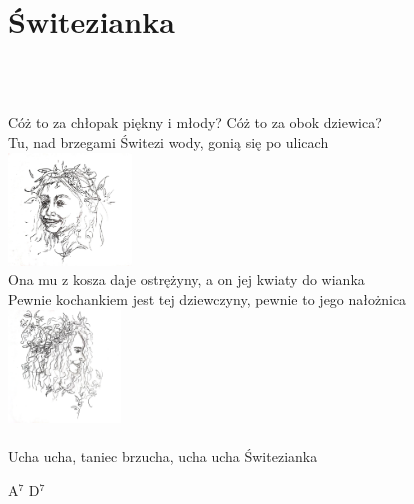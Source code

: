 \documentclass[a5paper, 10pt]{book}
\begin{document}
\section{Świtezianka}\textcolor{lightgray}{\textit{}}\\~\\
\begin{minipage}[t]{0.8\textwidth}
Cóż to za chłopak piękny i młody? Cóż to za obok dziewica?\\
Tu, nad brzegami Świtezi wody, gonią się po ulicach\\
\hspace*{10.5cm}\includegraphics[height=3cm]{switezianka.png}\vspace*{-3.1cm}\\
Ona mu z kosza daje ostrężyny, a on jej kwiaty do wianka\\
Pewnie kochankiem jest tej dziewczyny, pewnie to jego nałożnica\\
\hspace*{8.2cm}\includegraphics[height=3cm]{switezianka2.png}\vspace*{-3.1cm}\\
\\
\hspace*{5mm}Ucha ucha, taniec brzucha, ucha ucha Świtezianka\\
\end{minipage}
\begin{minipage}[t]{0.2\textwidth}
A$^7$ D$^7$\\

\end{minipage}

\newpage
\end{document}
